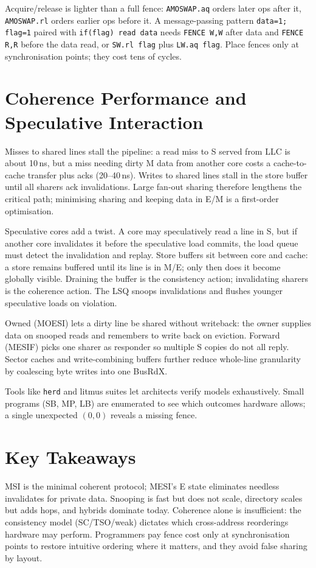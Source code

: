 Acquire/release is lighter than a full fence: \texttt{AMOSWAP.aq} orders later ops after it, \texttt{AMOSWAP.rl} orders earlier ops before it. A message-passing pattern \texttt{data=1; flag=1} paired with \texttt{if(flag) read data} needs \texttt{FENCE W,W} after data and \texttt{FENCE R,R} before the data read, or \texttt{SW.rl flag} plus \texttt{LW.aq flag}. Place fences only at synchronisation points; they cost tens of cycles.


\section{Coherence Performance and Speculative Interaction}\label{sec:perf-coh}
Misses to shared lines stall the pipeline: a read miss to S served from LLC is about 10\,ns, but a miss needing dirty M data from another core costs a cache-to-cache transfer plus acks (20--40\,ns). Writes to shared lines stall in the store buffer until all sharers ack invalidations. Large fan-out sharing therefore lengthens the critical path; minimising sharing and keeping data in E/M is a first-order optimisation.

Speculative cores add a twist. A core may speculatively read a line in S, but if another core invalidates it before the speculative load commits, the load queue must detect the invalidation and replay. Store buffers sit between core and cache: a store remains buffered until its line is in M/E; only then does it become globally visible. Draining the buffer is the consistency action; invalidating sharers is the coherence action. The LSQ snoops invalidations and flushes younger speculative loads on violation.

Owned (MOESI) lets a dirty line be shared without writeback: the owner supplies data on snooped reads and remembers to write back on eviction. Forward (MESIF) picks one sharer as responder so multiple S copies do not all reply. Sector caches and write-combining buffers further reduce whole-line granularity by coalescing byte writes into one BusRdX.

Tools like \texttt{herd} and litmus suites let architects verify models exhaustively. Small programs (SB, MP, LB) are enumerated to see which outcomes hardware allows; a single unexpected $(0,0)$ reveals a missing fence.

\section*{Key Takeaways}
MSI is the minimal coherent protocol; MESI's E state eliminates needless invalidates for private data. Snooping is fast but does not scale, directory scales but adds hops, and hybrids dominate today. Coherence alone is insufficient: the consistency model (SC/TSO/weak) dictates which cross-address reorderings hardware may perform. Programmers pay fence cost only at synchronisation points to restore intuitive ordering where it matters, and they avoid false sharing by layout.

